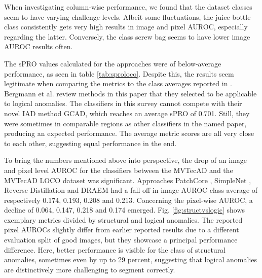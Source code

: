 

When investigating column-wise performance, we found that the dataset classes seem to have varying challenge levels. Albeit some fluctuations, 
the juice bottle class consistently gets very high results in image and pixel AUROC, especially regarding the latter. 
Conversely, the class screw bag seems to have lower image AUROC results often.




The sPRO values calculated for the approaches were of below-average performance, as seen in table \ref{tab:sproloco}. Despite this, the results seem legitimate when comparing the metrics to the 
class averages reported in \cite{LOCODentsAndScratchesBergmann2022}. Bergmann et al. review methods 
in this paper that they selected to be applicable to logical anomalies. The classifiers in this survey cannot compete with their novel IAD method GCAD, which reaches an 
average sPRO of 0.701. Still, they were sometimes in comparable regions as other classifiers in the named paper, producing an expected performance. 
The average metric scores are all very close to each other, suggesting equal performance in the end.





To bring the numbers mentioned above into perspective, the drop of an image and pixel level AUROC for the classifiers between the 
MVTecAD \cite{MVTEC_Bergmann_2021} and the MVTecAD LOCO \cite{LOCODentsAndScratchesBergmann2022} dataset was significant. Approaches 
PatchCore \cite{patchCore2022}, SimpleNet \cite{liu2023simplenet}, Reverse Distillation \cite{revdist2023} and DRAEM \cite{Zavrtanik_2021DRAEM} had a fall off 
in image AUROC class average of respectively 0.174, 0.193, 0.208 and 0.213. Concerning the pixel-wise 
AUROC, a decline of 0.064, 0.147, 0.218 and 0.174 emerged. \newline
Fig. \ref{fig:structvslogic} shows exemplary metrics divided by structural and logical anomalies. The reported pixel AUROCs slightly differ from earlier reported results due to a different 
evaluation split of good images, but they showcase a principal performance difference. Here, better performance is visible for the 
class of structural anomalies, sometimes even by up to 29 percent, suggesting that logical anomalies are distinctively more challenging to segment correctly.

